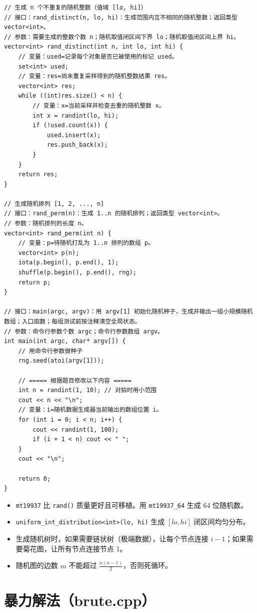 \documentclass[UTF8,openany,oneside,zihao=-4]{ctexbook}
\begin{document}
\begin{lstlisting}
// 生成 n 个不重复的随机整数（值域 [lo, hi]）
// 接口：rand_distinct(n, lo, hi)：生成范围内互不相同的随机整数；返回类型 vector<int>。
// 参数：需要生成的整数个数 n；随机取值闭区间下界 lo；随机取值闭区间上界 hi。
vector<int> rand_distinct(int n, int lo, int hi) {
    // 变量：used=记录每个对象是否已被使用的标记 used。
    set<int> used;
    // 变量：res=尚未重复采样得到的随机整数结果 res。
    vector<int> res;
    while ((int)res.size() < n) {
        // 变量：x=当前采样并检查去重的随机整数 x。
        int x = randint(lo, hi);
        if (!used.count(x)) {
            used.insert(x);
            res.push_back(x);
        }
    }
    return res;
}

// 生成随机排列 [1, 2, ..., n]
// 接口：rand_perm(n)：生成 1..n 的随机排列；返回类型 vector<int>。
// 参数：随机排列的长度 n。
vector<int> rand_perm(int n) {
    // 变量：p=待随机打乱为 1..n 排列的数组 p。
    vector<int> p(n);
    iota(p.begin(), p.end(), 1);
    shuffle(p.begin(), p.end(), rng);
    return p;
}

// 接口：main(argc, argv)：用 argv[1] 初始化随机种子，生成并输出一组小规模随机数组；入口函数；每组测试前按注释清空全局状态。
// 参数：命令行参数个数 argc；命令行参数数组 argv。
int main(int argc, char* argv[]) {
    // 用命令行参数做种子
    rng.seed(atoi(argv[1]));

    // ===== 根据题目修改以下内容 =====
    int n = randint(1, 10); // 对拍时用小范围
    cout << n << "\n";
    // 变量：i=随机数据生成器当前输出的数组位置 i。
    for (int i = 0; i < n; i++) {
        cout << randint(1, 100);
        if (i + 1 < n) cout << " ";
    }
    cout << "\n";

    return 0;
}
\end{lstlisting}

\begin{tip}
\begin{itemize}
  \item \lstinline|mt19937| 比 \lstinline|rand()| 质量更好且可移植。用 \lstinline|mt19937_64| 生成 64 位随机数。
  \item \lstinline|uniform_int_distribution<int>(lo, hi)| 生成 $[lo, hi]$ 闭区间均匀分布。
  \item 生成随机树时，如果需要链状树（极端数据），让每个节点连接 $i-1$；如果需要菊花图，让所有节点连接节点 1。
  \item 随机图的边数 $m$ 不能超过 $\frac{n(n-1)}{2}$，否则死循环。
\end{itemize}
\end{tip}

\section{暴力解法（brute.cpp）}
\end{document}
